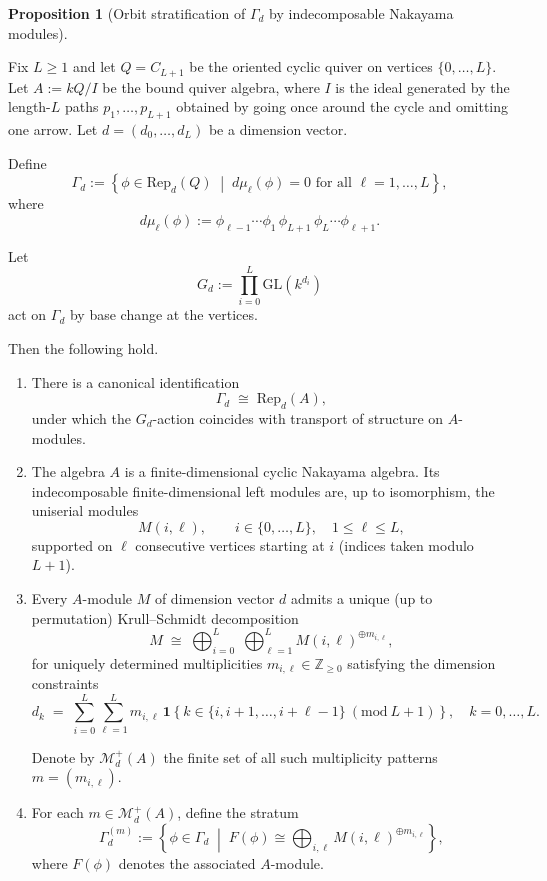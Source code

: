 \documentclass{article}
\theoremstyle{definition}
\newtheorem{proposition}[theorem]{Proposition}
\begin{document}
\begin{proposition}[Orbit stratification of $\Gamma_d$ by indecomposable Nakayama modules]
\label{prop:Gamma_orbit_stratification}

Fix $L \ge 1$ and let $Q = C_{L+1}$ be the oriented cyclic quiver on vertices
$\{0,\dots,L\}$.  
Let $A := kQ/I$ be the bound quiver algebra, where $I$ is the ideal generated by the length-$L$
paths $p_1,\dots,p_{L+1}$ obtained by going once around the cycle and omitting one arrow.
Let $d=(d_0,\dots,d_L)$ be a dimension vector.

Define
\[
\Gamma_d := \left\{
\phi \in \mathrm{Rep}_d(Q)
\;\middle|\;
d\mu_\ell(\phi)=0 \text{ for all } \ell=1,\dots,L
\right\},
\]
where
\[
d\mu_\ell(\phi) := \phi_{\ell-1}\cdots \phi_1\,\phi_{L+1}\,\phi_L\cdots \phi_{\ell+1}.
\]

Let
\[
G_d := \prod_{i=0}^{L} \mathrm{GL}(k^{d_i})
\]
act on $\Gamma_d$ by base change at the vertices.

\medskip

Then the following hold.

\begin{enumerate}
\item
There is a canonical identification
\[
\Gamma_d \;\cong\; \mathrm{Rep}_d(A),
\]
under which the $G_d$-action coincides with transport of structure on $A$-modules.

\item
The algebra $A$ is a finite-dimensional cyclic Nakayama algebra.  
Its indecomposable finite-dimensional left modules are, up to isomorphism, the uniserial modules
\[
M(i,\ell), \qquad i \in \{0,\dots,L\}, \quad 1 \le \ell \le L,
\]
supported on $\ell$ consecutive vertices starting at $i$ (indices taken modulo $L+1$).

\item
Every $A$-module $M$ of dimension vector $d$ admits a unique (up to permutation)
Krull--Schmidt decomposition
\[
M \;\cong\; \bigoplus_{i=0}^{L}\;\bigoplus_{\ell=1}^{L} M(i,\ell)^{\oplus m_{i,\ell}},
\]
for uniquely determined multiplicities $m_{i,\ell} \in \mathbb{Z}_{\ge 0}$ satisfying the
dimension constraints
\[
d_k \;=\;
\sum_{i=0}^{L}\sum_{\ell=1}^{L}
m_{i,\ell}\,
\mathbf{1}\!\left\{
k \in \{i,i+1,\dots,i+\ell-1\} \ (\mathrm{mod}\ L+1)
\right\},
\quad k=0,\dots,L.
\]

Denote by $\mathcal M_d^+(A)$ the finite set of all such multiplicity patterns
$m=(m_{i,\ell})$.

\item
For each $m \in \mathcal M_d^+(A)$, define the stratum
\[
\Gamma_d^{(m)}
:=
\left\{
\phi \in \Gamma_d
\;\middle|\;
F(\phi) \cong
\bigoplus_{i,\ell} M(i,\ell)^{\oplus m_{i,\ell}}
\right\},
\]
where $F(\phi)$ denotes the associated $A$-module.


\end{enumerate}
\end{proposition}
\end{document}
